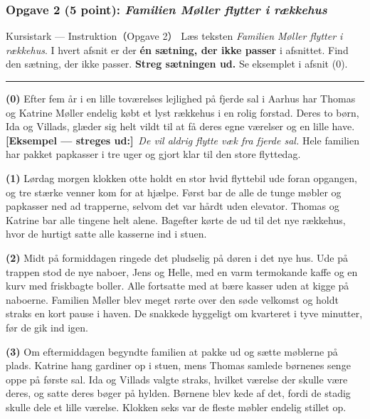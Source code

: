 \subsubsection*{Opgave 2 (5 point): \textit{Familien Møller flytter i rækkehus}}

\begin{emailbox}{Kursistark --- Instruktion（Opgave 2）}
Læs teksten \textit{Familien Møller flytter i rækkehus}. I hvert afsnit er der \textbf{én sætning, der ikke passer} i afsnittet. Find den sætning, der ikke passer. \textbf{Streg sætningen ud.} Se eksemplet i afsnit (0).

\vspace{0.35em}
\hrule
\vspace{0.4em}

\textbf{(0)} Efter fem år i en lille toværelses lejlighed på fjerde sal i Aarhus har Thomas og Katrine Møller endelig købt et lyst rækkehus i en rolig forstad. Deres to børn, Ida og Villads, glæder sig helt vildt til at få deres egne værelser og en lille have. \textcolor{NCDRed}{\textbf{[Eksempel --- streges ud:]}}\ \textit{De vil aldrig flytte væk fra fjerde sal.} Hele familien har pakket papkasser i tre uger og gjort klar til den store flyttedag.

\vspace{0.35em}
\textbf{(1)} Lørdag morgen klokken otte holdt en stor hvid flyttebil ude foran opgangen, og tre stærke venner kom for at hjælpe. Først bar de alle de tunge møbler og papkasser ned ad trapperne, selvom det var hårdt uden elevator. Thomas og Katrine bar alle tingene helt alene. Bagefter kørte de ud til det nye rækkehus, hvor de hurtigt satte alle kasserne ind i stuen.

\vspace{0.35em}
\textbf{(2)} Midt på formiddagen ringede det pludselig på døren i det nye hus. Ude på trappen stod de nye naboer, Jens og Helle, med en varm termokande kaffe og en kurv med friskbagte boller. Alle fortsatte med at bære kasser uden at kigge på naboerne. Familien Møller blev meget rørte over den søde velkomst og holdt straks en kort pause i haven. De snakkede hyggeligt om kvarteret i tyve minutter, før de gik ind igen.

\vspace{0.35em}
\textbf{(3)} Om eftermiddagen begyndte familien at pakke ud og sætte møblerne på plads. Katrine hang gardiner op i stuen, mens Thomas samlede børnenes senge oppe på første sal. Ida og Villads valgte straks, hvilket værelse der skulle være deres, og satte deres bøger på hylden. Børnene blev kede af det, fordi de stadig skulle dele et lille værelse. Klokken seks var de fleste møbler endelig stillet op.


\end{emailbox}
